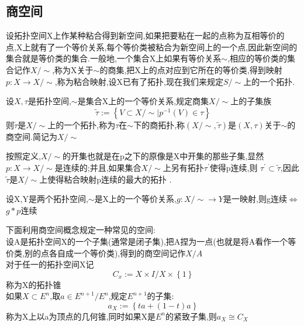 \subsection*{商空间}
设拓扑空间X上作某种粘合得到新空间,如果把要粘在一起的点称为互相等价的点,X上就有了一个等价关系,每个等价类被粘合为新空间上的一个点,因此新空间的集合就是等价类的集合.一般地,一个集合X上如果有等价关系\(\sim\),相应的等价类的集合记作\(X / \sim \),称为X关于\(\sim \)的商集,把X上的点对应到它所在的等价类,得到映射\(p : X \rightarrow X / \sim\),称为粘合映射,设X已有了拓扑,现在我们来规定\(S / \sim \)上的一个拓扑.
\begin{definition}
    设\( X, \tau \)是拓扑空间,\(\sim\)是集合X上的一个等价关系,规定商集\(X / \sim \)上的子集族 
    \[\widetilde{\tau} := \left\{V \subset X / \sim | p^{-1}(V) \in \tau \right\}\]
    则\(\widetilde{\tau}\)是\(X / \sim \)上的一个拓扑,称为\(\tau\)在\(\sim\)下的商拓扑,称\((X /\sim , \widetilde{\tau} )  \)是\((X,\tau)\)关于\(\sim\)的商空间.简记为\(X / \sim\)
\end{definition}
按照定义,\(X / \sim \)的开集也就是在p之下的原像是X中开集的那些子集,显然\(p : X \rightarrow X / \sim \)是连续的;并且,如果集合\(X / \sim \)上另有拓扑\(\tau^{'}\)使得p连续,则 \(\tau^{'} \subset \widetilde{\tau}\),因此\(\widetilde{\tau}\)是\(X / \sim\)上使得粘合映射p连续的最大的拓扑 . 
\begin{theorem}
    设X,Y是两个拓扑空间,\(\sim\)是X上的一个等价关系,\(g: X/\sim \rightarrow Y \)是一映射,则g连续\(\Leftrightarrow\)\(g*p\)连续
    \end{theorem}
    下面利用商空间概念规定一种常见的空间:
\\
设A是拓扑空间X的一个子集(通常是闭子集),把A捏为一点(也就是将A看作一个等价类,别的点各自成一个等价类),得到的商空间记作\(X / A \) \\
对于任一的拓扑空间X记 \[C_x := X \times I / X \times \left\{1\right\}\] 称为X的拓扑锥 \\
如果\(X \subset E^n\),取\(a \in E^{n+1} / E^n\),规定\(E^{n+1}\)的子集: 
\[a_X := \left\{ta +(1-t)a \right\}\]
称为X上以a为顶点的几何锥,同时如果X是\(E^n\)的紧致子集,则\(a_X \cong C_X \)

